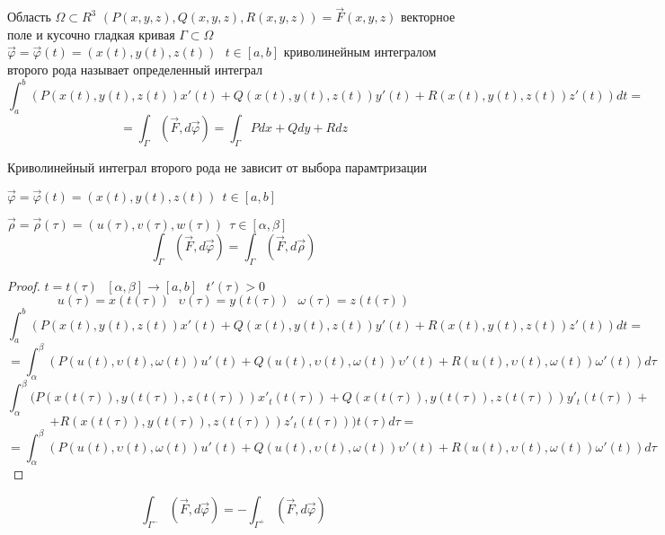 \begin{define}
  Область $\Omega \subset R^3$ $(P(x,y,z), Q(x,y,z), R(x,y,z)) = \vec F(x,y,z)$
  векторное поле и кусочно гладкая кривая
  $\Gamma \subset \Omega$ $\vec \varphi = \vec \varphi(t) = (x(t), y(t), z(t))
  ~~~ t \in [a,b]$
  криволинейным интегралом второго рода называет определенный интеграл
  $$
  \int_a^b (P(x(t), y(t), z(t))x'(t) + Q (x(t), y(t), z(t))y'(t) +
  R(x(t), y(t), z(t))z'(t))dt =
  $$
  $$
  = \int_{\Gamma} (\vec F, d \vec \varphi) =
  \int_{\Gamma} Pdx + Qdy + Rdz
  $$
\end{define}

\begin{theorem}
  Криволинейный интеграл второго рода не зависит от выбора парамтризации

  $\vec \varphi = \vec \varphi(t) = (x(t), y(t), z(t)) ~~ t \in [a,b]$

  $\vec \rho = \vec \rho(\tau) = (u(\tau), v(\tau), w(\tau)) ~~ \tau \in
  [\alpha, \beta]$
  $$
  \int_{\Gamma} (\vec F, d \vec \varphi) = \int_{\Gamma}(\vec F, d\vec \rho)
  $$
\end{theorem}

\begin{proof}
  $t = t(\tau) ~~~ [\alpha, \beta] \to [a,b] ~~~ t'(\tau) > 0$
  $$
  u(\tau) = x(t(\tau))
  ~~~
  \upsilon(\tau) = y(t(\tau))
  ~~~
  \omega(\tau) = z(t(\tau))
  $$
  $$
  \int_a^b (P(x(t), y(t), z(t))x'(t) + Q (x(t), y(t), z(t))y'(t) +
  R(x(t), y(t), z(t))z'(t))dt =
  $$
  $$
  = \int_{\alpha}^{\beta} (P(u(t), \upsilon(t), \omega(t))u'(t) + Q (u(t),
  \upsilon(t), \omega(t))\upsilon'(t) + R(u(t), \upsilon(t),
  \omega(t))\omega'(t))d\tau
  $$
  $$
  \int_{\alpha}^{\beta} (P(x(t(\tau)), y(t(\tau)), z(t(\tau)))x'_t(t(\tau)) +
  Q (x(t(\tau)), y(t(\tau)), z(t(\tau)))y'_t(t(\tau)) +
  $$
  $$
  + R(x(t(\tau)), y(t(\tau)), z(t(\tau)))z'_t(t(\tau))) t(\tau) d\tau =
  $$
  $$
  = \int_{\alpha}^{\beta} (P(u(t), \upsilon(t), \omega(t))u'(t) + Q (u(t),
  \upsilon(t), \omega(t))\upsilon'(t) + R(u(t), \upsilon(t),
  \omega(t))\omega'(t))d\tau
  $$
\end{proof}

\begin{theorem}
  $$
  \int_{\Gamma^-} (\vec F, d\vec \varphi) = - \int_{\Gamma^+} (\vec F, d \vec
  \varphi)
  $$
\end{theorem}

